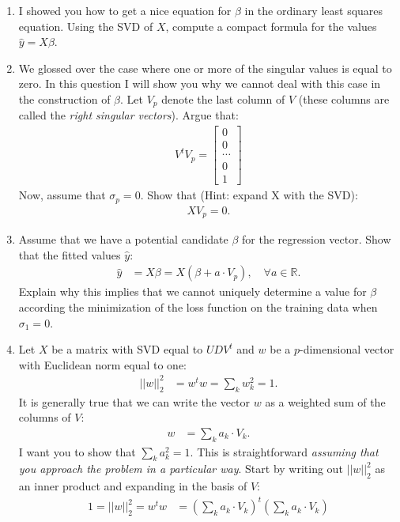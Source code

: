 \documentclass[12pt,hidelinks]{article}
\numberwithin{equation}{section}
\begin{document}
\begin{enumerate}
\item I showed you how to get a nice equation for $\beta$ in the ordinary
least squares equation. Using the SVD of $X$, compute a compact formula for
the values $\widehat{y} = X \beta$.
\item We glossed over the case where one or more of the singular values is equal
to zero. In this question I will show you why we cannot deal with this case
in the construction of $\beta$. Let $V_p$ denote the last column of $V$ (these
columns are called the \textit{right singular vectors}). Argue that:
\begin{align}
V^t V_p = \begin{bmatrix} 0 \\ 0 \\ \cdots \\ 0 \\ 1 \end{bmatrix}
\end{align}
Now, assume that $\sigma_p = 0$. Show that (Hint: expand X with the SVD):
\begin{align}
XV_p = 0.
\end{align}
\item Assume that we have a potential candidate $\beta$ for the regression vector.
Show that the fitted values $\widehat{y}$:
\begin{align}
\widehat{y} &= X \beta = X (\beta + a \cdot V_p), \quad \forall a \in \mathbb{R}.
\end{align}
Explain why this implies that we cannot uniquely determine a value for $\beta$
according the minimization of the loss function on the training data when
$\sigma_1 = 0$.
\item Let $X$ be a matrix with SVD equal to $UDV^t$ and $w$ be a
$p$-dimensional vector with Euclidean norm equal to one:
\begin{align}
|| w ||_2^2 &= w^t w = \sum_k w_k^2 = 1.
\end{align}
It is generally true that we can write the vector $w$ as a weighted sum of
the columns of $V$:
\begin{align}
w &= \sum_k a_k \cdot V_k.
\end{align}
I want you to show that $\sum_k a_k^2 = 1$. This is straightforward
\textit{assuming that you approach the problem in a particular way}. Start
by writing out $|| w ||_2^2$ as an inner product and expanding in the basis
of $V$:
\begin{align}
1 = || w ||_2^2 = w^t w &= \left(\sum_k a_k \cdot V_k \right)^t \left(\sum_k a_k \cdot V_k \right) \\

\end{align}
\end{enumerate}
\end{document}
